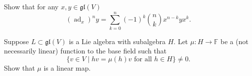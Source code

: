 \documentclass[12 pt, letterpaper]{hmcpset}
\begin{document}
\begin{problem}[1]
	Show that for any $x, y \in \mathfrak{gl}(V)$
	\[
		(\operatorname{ad}_{x})^{n} y = \sum_{k = 0}^{n} (-1)^{k} \binom{n}{k} x^{n - k} y x^{k}.
	\]
\end{problem}

\pagebreak

\begin{problem}[2]
	Suppose $L \subset \mathfrak{gl}(V)$ is a Lie algebra with subalgebra $H$. Let $\mu : H \to \mathbb{F}$ be a (not necessarily linear) function to the base field such that
	\[
		\{ v \in V \mid hv = \mu(h) v \text{ for all } h \in H \} \neq 0.
	\]
	Show that $\mu$ is a linear map.
\end{problem}
\end{document}
